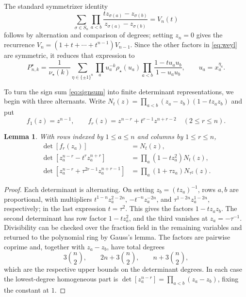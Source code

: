 \documentclass[12pt]{article}
\newtheorem{lemma}[theorem]{Lemma}
\numberwithin{equation}{section}
\begin{document}
The standard symmetrizer identity
\[
 \sum_{\sigma\in S_n}
 \prod_{a<b}\frac{tz_{\sigma(a)}-z_{\sigma(b)}}
                  {z_{\sigma(a)}-z_{\sigma(b)}}=V_n(t)
\]
follows by alternation and comparison of degrees; setting $z_n=0$
gives the recurrence $V_n=(1+t+\cdots+t^{n-1})V_{n-1}$.
Since the other factors in \eqref{eq:weyl} are symmetric, it reduces
that expression to
\begin{equation}\label{eq:signsum}
 P^\star_{n,k}
 =\frac{1}{\nu_\star(k)}
   \sum_{\eta\in\{\pm1\}^n}
   \prod_a u_a^{-k}\rho_\star(u_a)
   \prod_{a<b}\frac{1-tu_au_b}{1-u_au_b},
 \qquad u_a=x_a^{\eta_a}.
\end{equation}

To turn the sign sum \eqref{eq:signsum} into finite determinant
representations, we begin with three alternants.
Write $N_t(z)=\prod_{a<b}(z_a-z_b)(1-tz_az_b)$ and put
\[
 f_1(z)=z^{n-1},\qquad
 f_r(z)=z^{n-r}+t^{r-1}z^{n+r-2}\quad(2\le r\le n).
\]

\begin{lemma}
With rows indexed by $1\le a\le n$ and columns by $1\le r\le n$,
\begin{align}
 \det[f_r(z_a)]&=N_t(z),\label{eq:alternant-basic}\\
 \det[z_a^{n-r}-t^rz_a^{n+r}]
 &=\prod_a(1-tz_a^2)N_t(z),\label{eq:alternant-Ct}\\
 \det[z_a^{n-r}+\tau^{2r-1}z_a^{n+r-1}]
 &=\prod_a(1+\tau z_a)N_{\tau^2}(z).
 \label{eq:alternant-Bminus}
\end{align}
\end{lemma}

\begin{proof}
Each determinant is alternating.  On setting $z_b=(tz_a)^{-1}$,
rows $a,b$ are proportional, with multipliers
$t^{1-n}z_a^{2-2n}$, $-t^{-n}z_a^{-2n}$, and
$\tau^{1-2n}z_a^{1-2n}$, respectively; in the last expression
$t=\tau^2$.  This gives the factors $1-tz_az_b$.
The second determinant has row factor $1-tz_a^2$, and the third
vanishes at $z_a=-\tau^{-1}$.  Divisibility can be checked over the
fraction field in the remaining variables and returned to the polynomial
ring by Gauss's lemma.  The factors are pairwise coprime and,
together with $z_a-z_b$, have
total degrees
\[
 3\binom n2,\qquad 2n+3\binom n2,\qquad n+3\binom n2,
\]
which are the respective upper bounds on the determinant degrees.
In each case the lowest-degree homogeneous part is
$\det[z_a^{n-r}]=\prod_{a<b}(z_a-z_b)$, fixing the constant at $1$.
\end{proof}
\end{document}
